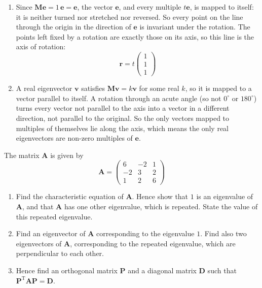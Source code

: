 \documentclass[leqno]{article}
\begin{document}
\begin{enumerate}[
  label=\textbf{\arabic*.},
  leftmargin=*,
  topsep=0pt,
  partopsep=0pt,
  parsep=0pt
]
\begin{djsSolution}
\begin{enumerate}[label=\textbf{(\alph*)}, start=1]
\begin{enumerate}[label=(\roman*), start=1]
    \item Since \(\mathbf{M}\mathbf{e}=1\,\mathbf{e}=\mathbf{e}\), the vector \(\mathbf{e}\), and every multiple \(t\mathbf{e}\), is mapped to itself: it is neither turned nor stretched nor reversed. So every point on the line through the origin in the direction of \(\mathbf{e}\) is invariant under the rotation. The points left fixed by a rotation are exactly those on its axis, so this line is the axis of rotation:
\[
\mathbf{r}=t\begin{pmatrix}1\\1\\1\end{pmatrix}
\]

    \item A real eigenvector \(\mathbf{v}\) satisfies \(\mathbf{M}\mathbf{v}=k\mathbf{v}\) for some real \(k\), so it is mapped to a vector parallel to itself. A rotation through an acute angle (so not \(0^\circ\) or \(180^\circ\)) turns every vector not parallel to the axis into a vector in a different direction, not parallel to the original. So the only vectors mapped to multiples of themselves lie along the axis, which means the only real eigenvectors are non-zero multiples of \(\mathbf{e}\).
  \end{enumerate}
\end{enumerate}
\end{djsSolution}

\newpage

\questionitem

The matrix $\mathbf{A}$ is given by
\[\mathbf{A} = \begin{pmatrix} 6 & -2 & 1 \\ -2 & 3 & 2 \\ 1 & 2 & 6 \end{pmatrix}\]
\begin{enumerate}[label=\textbf{(\alph*)}]
  \item Find the characteristic equation of $\mathbf{A}$. Hence show that $1$ is an eigenvalue of $\mathbf{A}$, and that $\mathbf{A}$ has one other eigenvalue, which is repeated. State the value of this repeated eigenvalue.  \\
  \item Find an eigenvector of $\mathbf{A}$ corresponding to the eigenvalue $1$. Find also two eigenvectors of $\mathbf{A}$, corresponding to the repeated eigenvalue, which are perpendicular to each other.  \\
  \item Hence find an orthogonal matrix $\mathbf{P}$ and a diagonal matrix $\mathbf{D}$ such that $\mathbf{P}^{\mathrm{T}}\mathbf{A}\mathbf{P} = \mathbf{D}$.  \\
\end{enumerate}


\end{enumerate}
\end{document}
